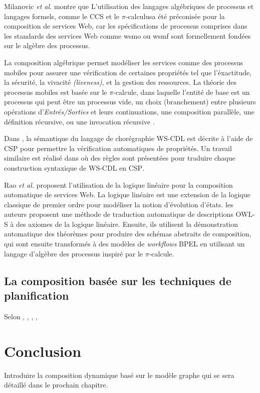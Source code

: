     Milanovic \textit{et al.} \cite{milanovic2004current} montre que
    L'utilisation des langages algébriques de processus et langages
    formels, comme le \textsc{CCS} et le $\pi$-calculusa été
    préconisée pour la composition de services Web, car les
    spécifications de processus comprises dans les standards des
    services Web comme \acrshort{wsmo} ou \acrshort{wsmf} sont
    formellement fondées sur le algèbre des processus.

    La composition algébrique permet modéliser les services comme des
    processus mobiles pour assurer une vérification de certaines
    propriétés tel que l'éxactitude, la sécurité, la vivacité
    \textit{(liveness)}, et la gestion des ressources. La théorie des
    processus mobiles est basée sur le $\pi$-calcule, dans laquelle
    l'entité de base est un processus qui peut être un processus vide,
    un choix (branchement) entre plusieurs opérations
    d'\textit{Entrés/Sorties} et leurs continuations, une composition
    parallèle, une définition récursive, ou une invocation récursive
    \cite{zahirathesis2008}.

    Dans \cite{koshkina2004modelling}, la sémantique du langage de
    chorégraphie \textsc{WS-CDL} est décrite à l'aide de \textsc{CSP}
    pour permettre la vérification automatiques de propriétés. Un
    travail similaire est réalisé dans \cite{li2007modeling} où des
    règles sont présentées pour traduire chaque construction
    syntaxique de \textsc{WS-CDL} en \textsc{CSP}.

    Rao \textit{et al.} \cite{rao2004logic} proposent l'utilisation de
    la logique linéaire pour la composition automatique de services
    Web. La logique linéaire est une extension de la logique classique
    de premier ordre pour modéliser la notion d'évolution d'états. les
    auteurs proposent une méthode de traduction automatique de
    descriptions \textsc{OWL-S} à des axiomes de la logique
    linéaire. Ensuite, ils utilisent la démonstration automatique des
    théorèmes pour produire des schémas abstraits de composition, qui
    sont ensuite transformés à des modèles de \textit{workflows}
    \textsc{BPEL} en utilisant un langage d'algèbre des processus
    inspiré par le $\pi$-calcule.

    \subsection{La composition basée sur les techniques de planification}
    \label{sec:techn-de-plan}
    Selon \cite{baryannis2010}, \cite{bartalos2011effective},
    \cite{chan2007survey}, \cite{peer2005web}, \cite{rodriguez2011automatic}

  \section{Conclusion}
  \label{sec:conclusion}
  Introduire la composition dynamique basé sur le modèle graphe qui se
  sera détaillé dans le prochain chapitre.


